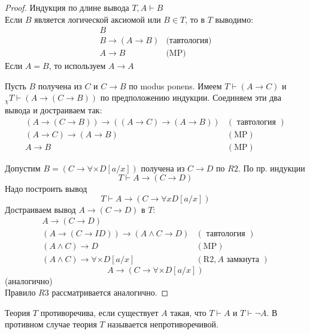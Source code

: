 \begin{proof}
Индукция по длине вывода $T, A \vdash B$\\
Если $B$ является логической аксиомой или $B \in T$, то в $T$ выводимо:
$$
\begin{array}{ll}
	B\\
	B \to (A \to B)& \text{(тавтология)}\\
	A \to B& \text{(MP)} 
\end{array}
$$
Если $A = B$, то используем $A \to A$
\vskip 0.2in

Пусть $B$ получена из $C$ и $C \rightarrow B$ по modus ponens.
Имеем $T \vdash(A \rightarrow C)$ и $_{\chi} T \vdash(A \rightarrow(C \rightarrow B))$ по предположению
индукции.
Соединяем эти два вывода и достраиваем так:
$$
\begin{array}{ll}
(A \rightarrow(C \rightarrow B)) \rightarrow((A \rightarrow C) \rightarrow(A \rightarrow B)) & (\text { тавтология }) \\
(A \rightarrow C) \rightarrow(A \rightarrow B) & (\mathrm{MP}) \\
A \rightarrow B & (\mathrm{MP})
\end{array}
$$
\vskip 0.1in

Допустим $B=(C \rightarrow \forall \times D[a / x])$ получена из $C \rightarrow D$ по $R 2 .$ По пр. индукции
$$
T \vdash A \rightarrow(C \rightarrow D)
$$
Надо построить вывод
$$
T \vdash A \rightarrow(C \rightarrow \forall x D[a / x])
$$
\vskip 0.1in
Достраиваем вывод $A \rightarrow(C \rightarrow D)$ в $T:$
$$
\begin{array}{ll}
A \rightarrow(C \rightarrow D) \\
(A \rightarrow(C \rightarrow I D)) \rightarrow(A \wedge C \rightarrow D) & (\text { тавтология }) \\
(A \wedge C) \rightarrow D & (\mathrm{MP}) \\
(A \wedge C) \rightarrow \forall \times D[a / x] & (\mathrm{R} 2, A \text { замкнута })
\end{array}
$$
$$
A \rightarrow(C \rightarrow \forall \times D[a / x])
$$
(аналогично)\\
Правило $R3$ рассматривается аналогично.
\end{proof}

\begin{defn}
Теория $T$ противоречива, если существует $A$ такая, что $T \vdash A$ и $T \vdash \neg A$. В противном случае теория $T$ называется непротиворечивой.
\end{defn}


